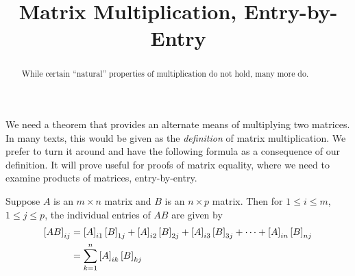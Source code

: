 \documentclass{ximera}
\title{Matrix Multiplication, Entry-by-Entry}
\begin{document}
\begin{abstract}
  While certain ``natural'' properties of multiplication do not hold, many more do.
\end{abstract}
\maketitle

We need a theorem that provides an alternate means of multiplying two
matrices.  In many texts, this would be given as the
\textit{definition} of matrix multiplication.  We prefer to turn it
around and have the following formula as a consequence of our
definition.  It will prove useful for proofs of matrix equality, where
we need to examine products of matrices, entry-by-entry.

\begin{theorem}
  \label{theorem:EMP}
  Suppose $A$ is an $m\times n$ matrix and $B$ is an $n\times p$ matrix.
  Then for $1\leq i\leq m$, $1\leq j\leq p$, the individual entries of
  $AB$ are given by
  \begin{align*}
    \left\lbrack AB\right\rbrack_{ij}
    &=
      \left\lbrack A\right\rbrack_{i1}\left\lbrack B\right\rbrack_{1j}+
      \left\lbrack A\right\rbrack_{i2}\left\lbrack B\right\rbrack_{2j}+
      \left\lbrack A\right\rbrack_{i3}\left\lbrack B\right\rbrack_{3j}+
      \cdots+
      \left\lbrack A\right\rbrack_{in}\left\lbrack B\right\rbrack_{nj}\\
    &=
      \sum_{k=1}^{n}\left\lbrack A\right\rbrack_{ik}\left\lbrack B\right\rbrack_{kj}
  \end{align*}
  

\end{theorem}
\end{document}
